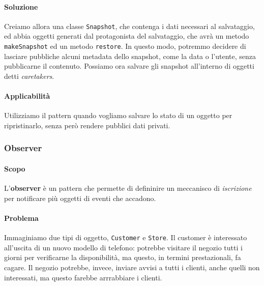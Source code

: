 \documentclass[11pt]{article}
\newcommand{\code}[1]{\texttt{#1}}
\begin{document}
\paragraph{Soluzione}
Creiamo allora una classe \code{Snapshot}, che contenga i dati necessari al salvataggio, ed abbia oggetti generati dal protagonista del salvataggio, che avrà un metodo \code{makeSnapshot} ed un metodo \code{restore}. In questo modo, potremmo decidere di lasciare pubbliche alcuni metadata dello snapshot, come la data o l'utente, senza pubblicarne il contenuto. Possiamo ora salvare gli snapshot all'interno di oggetti detti \textit{caretakers}. 
\paragraph{Applicabilità}
Utilizziamo il pattern quando vogliamo salvare lo stato di un oggetto per ripristinarlo, senza però rendere pubblici dati privati. 

\subsubsection{Observer}
\paragraph{Scopo}
L'\textbf{observer} è un pattern che permette di defininire un meccanisco di \textit{iscrizione} per notificare più oggetti di eventi che accadono.
\paragraph{Problema}
Immaginiamo due tipi di oggetto, \code{Customer} e \code{Store}. Il customer è interessato all'uscita di un nuovo modello di telefono: potrebbe visitare il negozio tutti i giorni per verificarne la disponibilità, ma questo, in termini prestazionali, fa cagare.
Il negozio potrebbe, invece, inviare avvisi a tutti i clienti, anche quelli non interessati, ma questo farebbe arrrabbiare i clienti.
\end{document}
